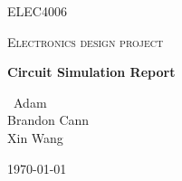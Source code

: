 \documentclass[12pt,a4paper]{report}
\begin{document}
\begin{titlepage}
	\centering
	{\scshape\LARGE ELEC4006 \par}
	\vspace{1cm}
	{\scshape\Large Electronics design project\par}
	\vspace{1.5cm}
	{\huge\bfseries Circuit Simulation Report\par}
	\vspace{2cm}
	{\Large\ Adam\\ Brandon Cann\\ Xin Wang \par}
	\vfill
	
	\vfill

	{\large \today\par}
\end{titlepage}
\end{document}
